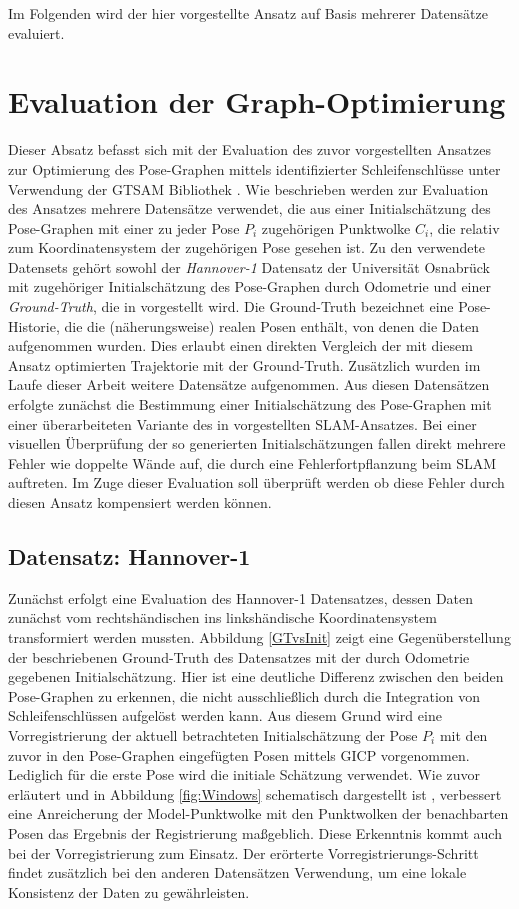 Im Folgenden wird der hier vorgestellte Ansatz auf Basis mehrerer Datensätze evaluiert.

\section{Evaluation der Graph-Optimierung}

Dieser Absatz befasst sich mit der Evaluation des zuvor vorgestellten Ansatzes zur Optimierung des Pose-Graphen mittels identifizierter Schleifenschlüsse unter Verwendung der GTSAM Bibliothek \cite{dellaert2012factor}. Wie beschrieben werden zur Evaluation des Ansatzes mehrere Datensätze verwendet, die aus einer Initialschätzung des Pose-Graphen mit einer zu jeder Pose $P_i$ zugehörigen Punktwolke $C_i$, die relativ zum Koordinatensystem der zugehörigen Pose gesehen ist. Zu den verwendete Datensets gehört sowohl der \emph{Hannover-1} Datensatz der Universität Osnabrück mit zugehöriger Initialschätzung des Pose-Graphen durch Odometrie und einer \emph{Ground-Truth}, die in \cite{sprickerhof2011heuristic} vorgestellt wird. Die Ground-Truth bezeichnet eine Pose-Historie, die die (näherungsweise) realen Posen enthält, von denen die Daten aufgenommen wurden. Dies erlaubt einen direkten Vergleich der mit diesem Ansatz optimierten Trajektorie mit der Ground-Truth. Zusätzlich wurden im Laufe dieser Arbeit weitere Datensätze aufgenommen. Aus diesen Datensätzen erfolgte zunächst die Bestimmung einer Initialschätzung des Pose-Graphen mit einer überarbeiteten Variante des in \cite{zhang2014loam} vorgestellten SLAM-Ansatzes. Bei einer visuellen Überprüfung der so generierten Initialschätzungen fallen direkt mehrere Fehler wie doppelte Wände auf, die durch eine Fehlerfortpflanzung beim SLAM auftreten. Im Zuge dieser Evaluation soll überprüft werden ob diese Fehler durch diesen Ansatz kompensiert werden können.

\subsection{Datensatz: Hannover-1}

Zunächst erfolgt eine Evaluation des Hannover-1 Datensatzes, dessen Daten zunächst vom rechtshändischen ins linkshändische Koordinatensystem transformiert werden mussten. Abbildung \ref{GTvsInit} zeigt eine Gegenüberstellung der beschriebenen Ground-Truth des Datensatzes mit der durch Odometrie gegebenen Initialschätzung. Hier ist eine deutliche Differenz zwischen den beiden Pose-Graphen zu erkennen, die nicht ausschließlich durch die Integration von Schleifenschlüssen aufgelöst werden kann. Aus diesem Grund wird eine Vorregistrierung der aktuell betrachteten Initialschätzung der Pose $P_i$ mit den zuvor in den Pose-Graphen eingefügten Posen mittels GICP vorgenommen. Lediglich für die erste Pose wird die initiale Schätzung verwendet. Wie zuvor erläutert und in Abbildung \ref{fig:Windows} schematisch dargestellt ist , verbessert eine Anreicherung der Model-Punktwolke mit den Punktwolken der benachbarten Posen das Ergebnis der Registrierung maßgeblich. Diese Erkenntnis kommt auch bei der Vorregistrierung zum Einsatz. Der erörterte Vorregistrierungs-Schritt findet zusätzlich bei den anderen Datensätzen Verwendung, um eine lokale Konsistenz der Daten zu gewährleisten.


